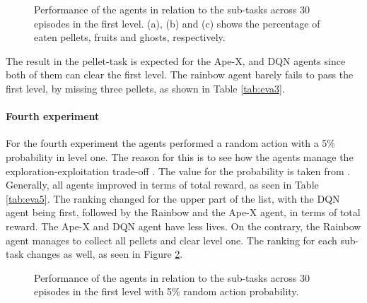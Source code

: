 \begin{figure}[H]
	\centering
	\smallskip
	\qquad
	\caption[Performance in sub-tasks in level 1]{Performance of the agents in relation to the sub-tasks across 30 episodes in the first level. (a), (b) and (c) shows the percentage of eaten pellets, fruits and ghosts, respectively.}
	\label{fig:ex3}
\end{figure}
The result in the pellet-task is expected for the Ape-X, and DQN agents since both of them can clear the first level. The rainbow agent barely fails to pass the first level, by missing three pellets, as shown in Table \ref{tab:eva3}.

\paragraph{Fourth experiment}
For the fourth experiment the agents performed a random action with a 5\% probability in level one. The reason for this is to see how the agents manage the exploration-exploitation trade-off \cite{thrun1992role}. The value for the probability is taken from \cite{2013arXiv1312.5602M}. Generally, all agents improved in terms of total reward, as seen in Table \ref{tab:eva5}. The ranking changed for the upper part of the list, with the DQN agent being first, followed by the Rainbow and the Ape-X agent, in terms of total reward. The Ape-X and DQN agent have less lives. On the contrary, the Rainbow agent manages to collect all pellets and clear level one. The ranking for each sub-task changes as well, as seen in Figure \ref{fig:ex5}.

\begin{figure}[H]
	\centering
	\smallskip
	\qquad
	\caption[Performance in sub-tasks with 5\% random action probability]{Performance of the agents in relation to the sub-tasks across 30 episodes in the first level with 5\% random action probability.}
	\label{fig:ex5}
\end{figure}

